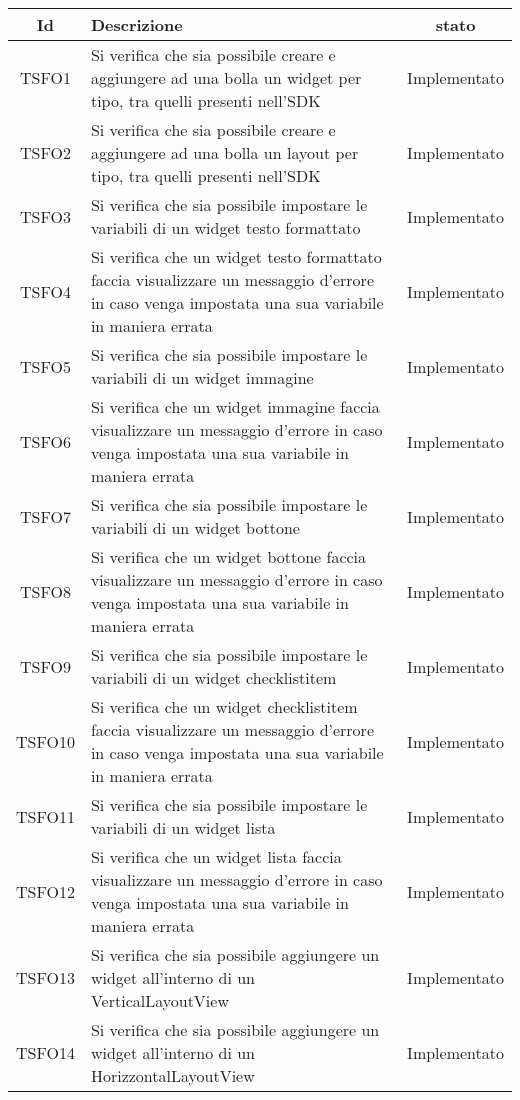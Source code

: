 \begin{center}
	\begin{longtable}{|c|>{\centering}m{10cm}|c|}\hline
		Id & Descrizione & stato \\ \hline
		TSFO1 & Si verifica che sia possibile creare e aggiungere ad una bolla un widget per tipo, tra quelli presenti nell'SDK & Implementato \\ \hline
		TSFO2 & Si verifica che sia possibile creare e aggiungere ad una bolla un layout per tipo, tra quelli presenti nell'SDK & Implementato \\ \hline
		TSFO3 & Si verifica che sia possibile impostare le variabili di un widget testo formattato & Implementato \\ \hline
		TSFO4 & Si verifica che un widget testo formattato faccia visualizzare un messaggio d'errore in caso venga impostata una sua variabile in maniera errata & Implementato \\ \hline
		TSFO5 & Si verifica che sia possibile impostare le variabili di un widget immagine & Implementato \\ \hline
		TSFO6 & Si verifica che un widget immagine faccia visualizzare un messaggio d'errore in caso venga impostata una sua variabile in maniera errata & Implementato \\ \hline
		TSFO7 & Si verifica che sia possibile impostare le variabili di un widget bottone & Implementato \\ \hline
		TSFO8 & Si verifica che un widget bottone faccia visualizzare un messaggio d'errore in caso venga impostata una sua variabile in maniera errata & Implementato \\ \hline
		TSFO9 & Si verifica che sia possibile impostare le variabili di un widget checklistitem & Implementato \\ \hline
		TSFO10 & Si verifica che un widget checklistitem faccia visualizzare un messaggio d'errore in caso venga impostata una sua variabile in maniera errata & Implementato \\ \hline
		TSFO11 & Si verifica che sia possibile impostare le variabili di un widget lista & Implementato \\ \hline
		TSFO12 & Si verifica che un widget lista faccia visualizzare un messaggio d'errore in caso venga impostata una sua variabile in maniera errata & Implementato \\ \hline
		TSFO13 & Si verifica che sia possibile aggiungere un widget all'interno di un VerticalLayoutView & Implementato \\ \hline
		TSFO14 & Si verifica che sia possibile aggiungere un widget all'interno di un HorizzontalLayoutView & Implementato \\ \hline

\end{longtable}
\end{center}
